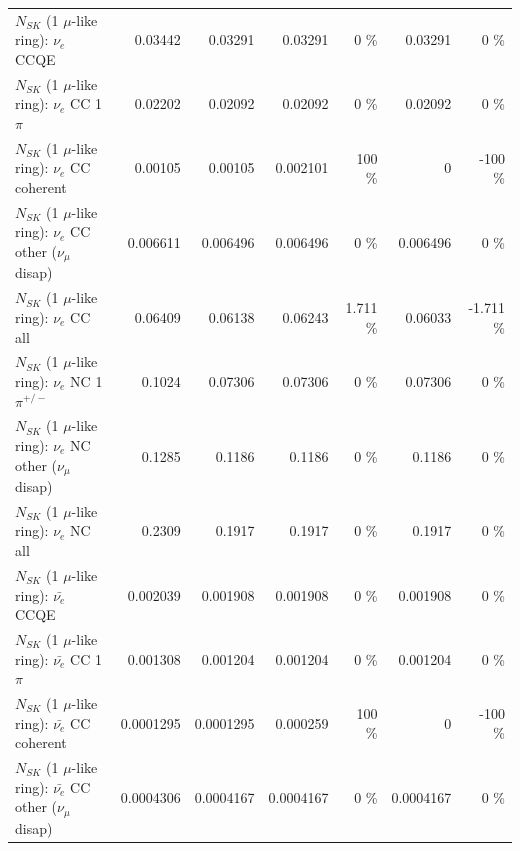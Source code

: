 \begin{table}
\begin{tabular}{| l | r | r | r  r | r  r |}
\hline
\hline
\hline
                                      $N_{SK}$ (1 $\mu$-like ring): $\nu_e$ CCQE &         0.03442 &         0.03291 &         0.03291 &        0 \%  &         0.03291 &        0 \%  \\ 
                                 $N_{SK}$ (1 $\mu$-like ring): $\nu_e$ CC 1$\pi$ &         0.02202 &         0.02092 &         0.02092 &        0 \%  &         0.02092 &        0 \%  \\ 
                               $N_{SK}$ (1 $\mu$-like ring): $\nu_e$ CC coherent &         0.00105 &         0.00105 &        0.002101 &      100 \%  &               0 &     -100 \%  \\ 
                $N_{SK}$ (1 $\mu$-like ring): $\nu_e$ CC other ($\nu_\mu$ disap) &        0.006611 &        0.006496 &        0.006496 &        0 \%  &        0.006496 &        0 \%  \\ 
                                  $N_{SK}$ (1 $\mu$-like ring): $\nu_{e}$ CC all &         0.06409 &         0.06138 &         0.06243 &    1.711 \%  &         0.06033 &   -1.711 \%  \\ 
\hline
                           $N_{SK}$ (1 $\mu$-like ring): $\nu_e$ NC 1$\pi^{+/-}$ &          0.1024 &         0.07306 &         0.07306 &        0 \%  &         0.07306 &        0 \%  \\ 
                $N_{SK}$ (1 $\mu$-like ring): $\nu_e$ NC other ($\nu_\mu$ disap) &          0.1285 &          0.1186 &          0.1186 &        0 \%  &          0.1186 &        0 \%  \\ 
                                  $N_{SK}$ (1 $\mu$-like ring): $\nu_{e}$ NC all &          0.2309 &          0.1917 &          0.1917 &        0 \%  &          0.1917 &        0 \%  \\ 
\hline
\hline
\hline
                                $N_{SK}$ (1 $\mu$-like ring): $\bar{\nu_e}$ CCQE &        0.002039 &        0.001908 &        0.001908 &        0 \%  &        0.001908 &        0 \%  \\ 
                           $N_{SK}$ (1 $\mu$-like ring): $\bar{\nu_e}$ CC 1$\pi$ &        0.001308 &        0.001204 &        0.001204 &        0 \%  &        0.001204 &        0 \%  \\ 
                         $N_{SK}$ (1 $\mu$-like ring): $\bar{\nu_e}$ CC coherent &       0.0001295 &       0.0001295 &        0.000259 &      100 \%  &               0 &     -100 \%  \\ 
          $N_{SK}$ (1 $\mu$-like ring): $\bar{\nu_e}$ CC other ($\nu_\mu$ disap) &       0.0004306 &       0.0004167 &       0.0004167 &        0 \%  &       0.0004167 &        0 \%  \\ 

\end{tabular}
\end{table}
